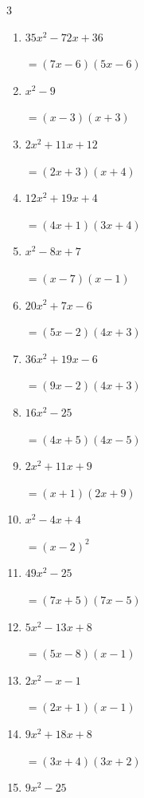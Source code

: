 \begin{multicols}{3}
\begin{enumerate}
\columnbreak %

\resetques

  \item $35x^{2}-72x+36$

        $=(7x-6)(5x-6)$

  \item $x^{2}-9$

        $=(x-3)(x+3)$

  \item $2x^{2}+11x+12$

        $=(2x+3)(x+4)$

  \item $12x^{2}+19x+4$

        $=(4x+1)(3x+4)$

  \item $x^{2}-8x+7$

        $=(x-7)(x-1)$

  \item $20x^{2}+7x-6$

        $=(5x-2)(4x+3)$

  \item $36x^{2}+19x-6$

        $=(9x-2)(4x+3)$

  \item $16x^{2}-25$

        $=(4x+5)(4x-5)$

  \item $2x^{2}+11x+9$

        $=(x+1)(2x+9)$

  \item $x^{2}-4x+4$

        $=(x-2)^{2}$

\columnbreak %

  \item $49x^{2}-25$

        $=(7x+5)(7x-5)$

  \item $5x^{2}-13x+8$

        $=(5x-8)(x-1)$

  \item $2x^{2}-x-1$

        $=(2x+1)(x-1)$

  \item $9x^{2}+18x+8$

        $=(3x+4)(3x+2)$

  \item $9x^{2}-25$


\end{enumerate}
\end{multicols}
